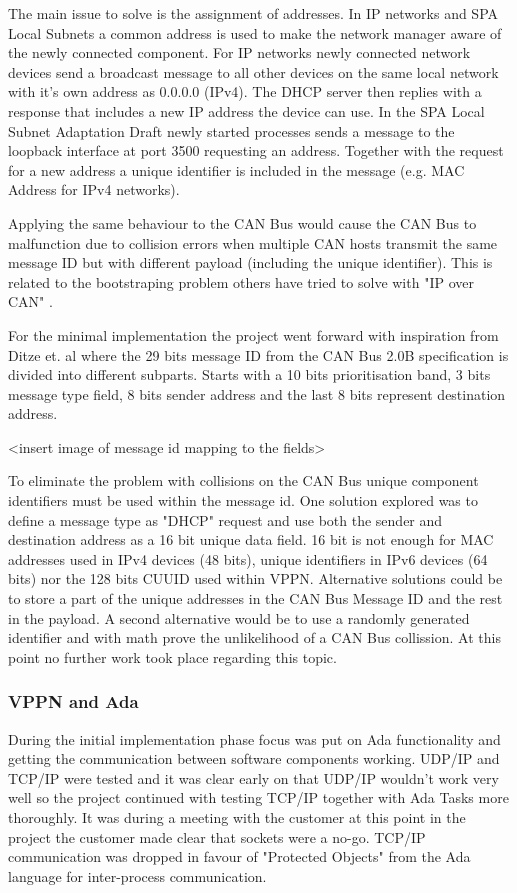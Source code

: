 The main issue to solve is the assignment of addresses. In IP networks and SPA Local
Subnets a common address is used to make the network manager aware of the newly
connected component. For IP networks newly connected network devices send a
broadcast message to all other devices on the same local network with it's own
address as 0.0.0.0 (IPv4). The DHCP server then replies with a response that
includes a new IP address the device can use. In the SPA Local Subnet
Adaptation Draft newly started processes sends a message to the loopback
interface at port 3500 requesting an address. Together with the request for a
new address a unique identifier is included in the message (e.g. MAC Address
for IPv4 networks).

Applying the same behaviour to the CAN Bus would cause the CAN Bus to
malfunction due to collision errors when multiple CAN hosts transmit the same
message ID but with different payload (including the unique identifier).
This is related to the bootstraping problem others have tried to solve with
"IP over CAN" \cite{web:draft-ip_over_can, web:porting_ip_can}.

For the minimal implementation the project went forward with inspiration from
Ditze et. al \cite{web:porting_ip_can} where the 29 bits message ID from the
CAN Bus 2.0B specification is divided into different subparts. Starts with a 10
bits prioritisation band, 3 bits message type field, 8 bits sender address and
the last 8 bits represent destination address.

<insert image of message id mapping to the fields>

To eliminate the problem with collisions on the CAN Bus unique component
identifiers must be used within the message id. One solution explored was to
define a message type as "DHCP" request and use both the sender and destination
address as a 16 bit unique data field. 16 bit is not enough for MAC addresses
used in IPv4 devices (48 bits), unique identifiers in IPv6 devices (64 bits)
nor the 128 bits CUUID used within VPPN. Alternative
solutions could be to store a part of the unique addresses in the CAN Bus
Message ID and the rest in the payload. A second alternative would be
to use a randomly generated identifier and with math prove the unlikelihood of
a CAN Bus collission. At this point no further work took place regarding this topic.

\subsubsection{VPPN and Ada}
During the initial implementation phase focus was put on Ada functionality and
getting the communication between software components working. UDP/IP and TCP/IP
were tested and it was clear early on that UDP/IP wouldn't work very well so
the project continued with testing TCP/IP together with Ada Tasks more
thoroughly. It was during a meeting with the customer at this point in the
project the customer made clear that sockets were a no-go. TCP/IP communication
was dropped in favour of "Protected Objects" from the Ada language for
inter-process communication.

